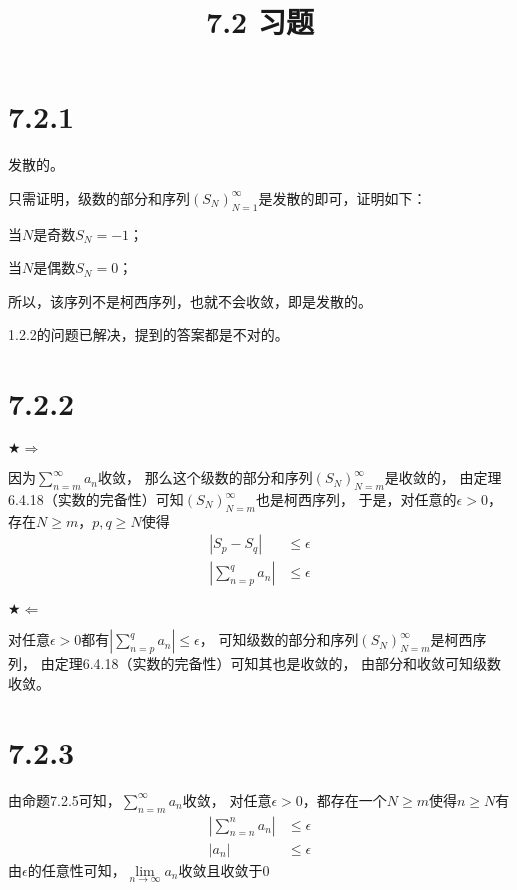 \documentclass{article}
\theoremstyle{mystyle}
\begin{document}
\title{7.2 习题}
\maketitle

\section*{7.2.1}

发散的。

只需证明，级数的部分和序列$(S_N)_{N=1}^\infty$是发散的即可，证明如下：

当$N$是奇数$S_N = -1$；

当$N$是偶数$S_N = 0$；

所以，该序列不是柯西序列，也就不会收敛，即是发散的。

1.2.2的问题已解决，提到的答案都是不对的。

\section*{7.2.2}

$\bigstar \Rightarrow$

因为$\sum \limits_{n=m} ^{\infty} a_n$收敛，
那么这个级数的部分和序列$(S_N)_{N=m}^{\infty}$是收敛的，
由定理6.4.18（实数的完备性）可知$(S_N)_{N=m}^{\infty}$也是柯西序列，
于是，对任意的$\epsilon > 0$，存在$N \geq m$，$p,q \geq N$使得
\begin{align}
  |S_p - S_q|                & \leq \epsilon \\
  |\sum \limits_{n=p}^q a_n| & \leq \epsilon
\end{align}

$\bigstar \Leftarrow$

对任意$\epsilon > 0$都有$|\sum \limits_{n=p}^q a_n| \leq \epsilon$，
可知级数的部分和序列$(S_N)_{N=m}^{\infty}$是柯西序列，
由定理6.4.18（实数的完备性）可知其也是收敛的，
由部分和收敛可知级数收敛。

\section*{7.2.3}

由命题7.2.5可知，$\sum \limits_{n=m} ^{\infty} a_n$收敛，
对任意$\epsilon > 0$，都存在一个$N \geq m$使得$n \geq N$有
\begin{align*}
  |\sum \limits_{n=n}^n a_n| & \leq \epsilon \\
  |a_n|                      & \leq \epsilon
\end{align*}
由$\epsilon$的任意性可知，$\lim \limits_{n \to \infty} a_n$收敛且收敛于$0$
\end{document}
